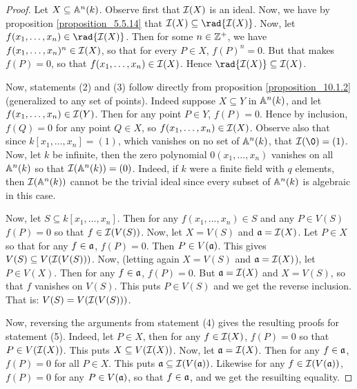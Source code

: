 \begin{proof}
  Let $X \subseteq \mathbb{A}^n(k)$. Observe first that $\mathcal{I}(X)$ is an ideal.
  Now, we have by proposition \ref{proposition_5.5.14} that
  $\Ic(X) \subseteq \rad{\Ic(X)}$. Now, let $f(x_1, \dots, x_n) \in
  \rad{\Ic(X)}$. Then for some $n \in \mathbb{Z}^+$, we have $f(x_1, \dots,
  x_n)^n \in \mathcal{I}(X)$, so that for every $P \in X$, $f(P)^n=0$. But
  that makes $f(P)=0$, so that $f(x_1, \dots, x_n) \in \mathcal{I}(X)$.
  Hence $\rad{\Ic(X)} \subseteq \Ic(X)$.

  Now, statements (2) and (3) follow directly from proposition
  \ref{proposition_10.1.2} (generalized to any set of points). Indeed
  suppose $X \subseteq Y$ in $\mathbb{A}^n(k)$, and let $f(x_1, \dots, x_n)
  \in \mathcal{I}(Y)$. Then for any point $P \in Y$, $f(P)=0$. Hence by
  inclusion, $f(Q)=0$ for any point $Q \in X$, so $f(x_1, \dots, x_n)
  \in \mathcal{I}(X)$. Observe also that since $k[x_1, \dots, x_n]=(1)$, which
  vanishes on no set of $\mathbb{A}^n(k)$, that $\Ic(\0)=(1)$. Now, let $k$ be
  infinite, then the zero polynomial $0(x_1, \dots, x_n)$ vanishes on
  all $\mathbb{A}^n(k)$ so that $\mathcal{I}(\mathbb{A}^n(k))=(0)$. Indeed, if $k$ were a
  finite field with $q$ elements, then $\mathcal{I}(\mathbb{A}^n(k))$ cannot be the
  trivial ideal since every subset of $\mathbb{A}^n(k)$ is algebraic in this
  case.

  Now, let $S \subseteq k[x_1, \dots, x_n]$. Then for any $f(x_1,
  \dots, x_n) \in S$ and any $P \in V(S)$ $f(P)=0$ so that $f \in
  \mathcal{I}(V(S))$. Now, let $X=V(S)$ and $\mathfrak{a}=\mathcal{I}(X)$. Let $P \in X$ so
  that for any $f \in \mathfrak{a}$, $f(P)=0$. Then $P \in V(\mathfrak{a})$. This gives
  $V(S) \subseteq V(\mathcal{I}(V(S)))$. Now, (letting again $X=V(S)$ and
  $\mathfrak{a}=\mathcal{I}(X)$), let $P \in V(X)$. Then for any $f \in \mathfrak{a}$, $f(P)=0$.
  But $\mathfrak{a}=\mathcal{I}(X)$ and $X=V(S)$, so that $f$ vanishes on $V(S)$. This
  puts $P \in V(S)$ and we get the reverse inclusion. That is:
  $V(S)=V(\mathcal{I}(V(S)))$.

  Now, reversing the arguments from statement (4) gives the resulting
  proofs for statement (5). Indeed, let $P \in X$, then for any
  $f \in \mathcal{I}(X)$, $f(P)=0$ so that $P \in V(\mathcal{I}(X))$. This puts
  $X \subseteq V(\mathcal{I}(X))$. Now, let $\mathfrak{a}=\mathcal{I}(X)$. Then for any
  $f \in \mathfrak{a}$, $f(P)=0$ for all $P \in X$. This puts $\mathfrak{a} \subseteq
  \mathcal{I}(V(\mathfrak{a}))$. Likewise for any $f \in \mathcal{I}(V(\mathfrak{a}))$, $f(P)=0$ for
  any $P \in V(\mathfrak{a})$, so that $f \in \mathfrak{a}$, and we get the resuilting
  equality.
\end{proof}

